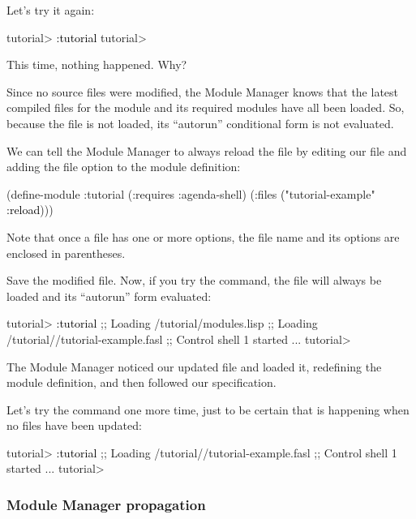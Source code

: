 \documentclass[10pt,twoside,english,pdftex]{article}
\begin{document}
Let's try it again:
%
\W\supp
\begin{example}
\textcolor{darkergray}{%
  tutorial> \textcolor{black}{:tutorial}
  tutorial>}
\end{example}
%
This time, nothing happened.  Why?

Since no source files were modified, the Module Manager knows that the latest
compiled files for the  module and its required modules have
all been loaded.  So, because the  file is not
loaded, its ``autorun'' conditional form is not evaluated.

We can tell the Module Manager to always reload the
 file by editing our 
file and adding the  file option to the  module
definition:
%
\W\supp
\begin{example}
\textcolor{darkergray}{%
  (define-module :tutorial
    (:requires :agenda-shell)
    (:files \textcolor{black}{(}"tutorial-example" \textcolor{black}{:reload})))}
\end{example}
%
Note that once a file has one or more options, the file name and its options
are enclosed in parentheses.

Save the modified  file. Now, if you try the
 command, the  file will always
be loaded and its ``autorun'' form evaluated:
%
\W\supp
\begin{example}
\textcolor{darkergray}{%
  tutorial> \textcolor{black}{:tutorial}
  ;; Loading /tutorial/modules.lisp
  ;; Loading /tutorial//tutorial-example.fasl
  ;; Control shell 1 started
     ...
  tutorial>}
\end{example}
%
The Module Manager noticed our updated  file and
loaded it, redefining the  module definition, and then
followed our  specification.

Let's try the  command one more time, just to be certain that
 is happening when no files have been updated:
%
\W\supp
\begin{example}
\textcolor{darkergray}{%
  tutorial> \textcolor{black}{:tutorial}
  ;; Loading /tutorial//tutorial-example.fasl
  ;; Control shell 1 started
     ...
  tutorial>}
\end{example}

\subsubsection*{Module Manager propagation}
\end{document}
